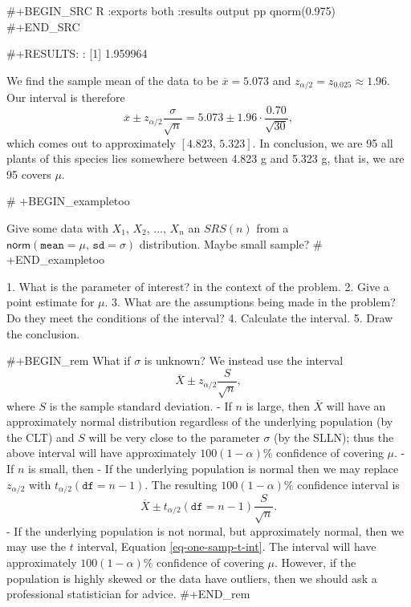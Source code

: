 #+BEGIN_SRC R :exports both :results output pp 
qnorm(0.975)
#+END_SRC

#+RESULTS:
: [1] 1.959964

We find the sample mean of the data to be \(\overline{x}=5.073\) and
\(z_{\alpha/2}=z_{0.025}\approx1.96\). Our interval is therefore \[
\overline{x}\pm
z_{\alpha/2}\frac{\sigma}{\sqrt{n}}=5.073\pm1.96\cdot\frac{0.70}{\sqrt{30}},
\] which comes out to approximately \([4.823,\,5.323]\). In
conclusion, we are 95%
all plants of this species lies somewhere between 4.823 g and 5.323 g,
that is, we are 95%
covers \(\mu\).

# +BEGIN_exampletoo

Give some data with \(X_{1}\), \(X_{2}\), ..., \(X_{n}\) an \(SRS(n)\)
from a \(\mathsf{norm}(\mathtt{mean}=\mu,\,\mathtt{sd}=\sigma)\)
distribution. Maybe small sample?
# +END_exampletoo


1. What is the parameter of interest? in the context of the problem.
2. Give a point estimate for \(\mu\).
3. What are the assumptions being made in the problem? Do they meet
   the conditions of the interval?
4. Calculate the interval.
5. Draw the conclusion.

#+BEGIN_rem
What if \(\sigma\) is unknown? We instead use the interval
\begin{equation}
\overline{X}\pm z_{\alpha/2}\frac{S}{\sqrt{n}},
\end{equation}
where \(S\) is the sample standard deviation.
- If \(n\) is large, then \(\overline{X}\) will have an approximately
  normal distribution regardless of the underlying population (by the
  CLT) and \(S\) will be very close to the parameter \(\sigma\) (by
  the SLLN); thus the above interval will have approximately
  \(100(1-\alpha)\%\) confidence of covering \(\mu\).
- If \(n\) is small, then
   - If the underlying population is normal then we may replace
     \(z_{\alpha/2}\) with \(t_{\alpha/2}(\mathtt{df}=n-1)\). The
     resulting \(100(1-\alpha)\%\) confidence interval is
     \begin{equation}
     \label{eq-one-samp-t-int}
     \overline{X}\pm t_{\alpha/2}(\mathtt{df}=n-1)\frac{S}{\sqrt{n}}.
     \end{equation}
   - If the underlying population is not normal, but approximately
     normal, then we may use the \(t\) interval, Equation
     \eqref{eq-one-samp-t-int}. The interval will have approximately
     \(100(1-\alpha)\%\) confidence of covering \(\mu\). However, if
     the population is highly skewed or the data have outliers, then
     we should ask a professional statistician for advice.
#+END_rem

